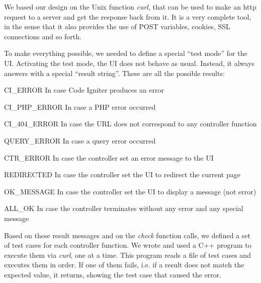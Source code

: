 We based our design on the Unix function \emph{curl}, that can be used to make an http request to a server and get the response back from it. It is a very complete tool, in the sense that it also provides the use of POST variables, cookies, SSL connections and so forth.

To make everything possible, we needed to define a special ``test mode'' for the UI. Activating the test mode, the UI does not behave as usual. Instead, it always answers with a special ``result string''. These are all the possible results:
\begin{description}
\item CI\_ERROR In case Code Igniter produces an error
\item CI\_PHP\_ERROR In case a PHP error occurred
\item CI\_404\_ERROR In case the URL does not correspond to any controller function
\item QUERY\_ERROR In case a query error occurred
\item CTR\_ERROR In case the controller set an error message to the UI
\item REDIRECTED In case the controller set the UI to redirect the current page
\item OK\_MESSAGE In case the controller set the UI to display a message (not error)
\item ALL\_OK In case the controller terminates without any error and any special message
\end{description}

Based on these result messages and on the \emph{check} function calls, we defined a set of test cases for each controller function. We wrote and used a C++ program to execute them via \emph{curl}, one at a time. This program reads a file of test cases and executes them in order. If one of them fails, i.e. if a result does not match the expected value, it returns, showing the test case that caused the error.

